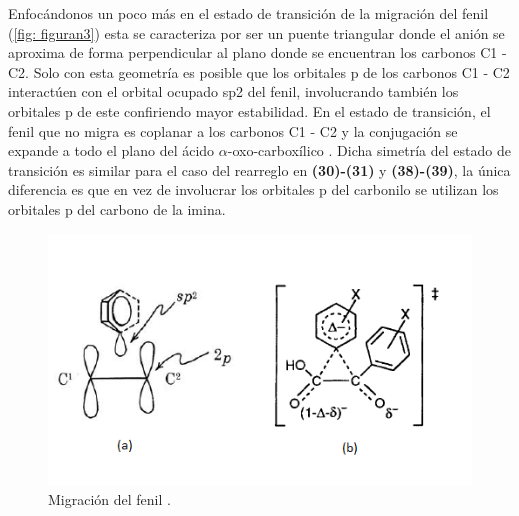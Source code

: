 \documentclass[fleqn,10pt]{SelfArx}
\begin{document}
Enfocándonos un poco más en el estado de transición de la migración del fenil (\autoref{fig: figuran3}) esta se caracteriza por ser un puente triangular \cite{yamabe2006}\cite{bowden1994} donde el anión se aproxima de forma perpendicular al plano donde se encuentran los carbonos C1 - C2.  Solo con esta geometría es posible que los orbitales p de los carbonos C1 - C2 interactúen con el orbital ocupado sp2 del fenil, involucrando también los orbitales p de este \cite{phelan1967} confiriendo mayor estabilidad. En el estado de transición, el fenil que no migra es coplanar a los carbonos C1 - C2 y la conjugación se expande a todo el plano del ácido $\alpha$-oxo-carboxílico \cite{yamabe2006}. Dicha simetría del estado de transición es similar para el caso del rearreglo en \textbf{(30)-(31)} y \textbf{(38)-(39)}, la única diferencia es que en vez de involucrar los orbitales p del carbonilo se utilizan los orbitales p del carbono de la imina.
\begin{figure}[h]
	\centering
	\includegraphics[width=\linewidth]{figuran3.png}
	\caption{Migraci\'on del fenil \cite{phelan1967}.}
	\label{fig: figuran3}
\end{figure}
\end{document}

